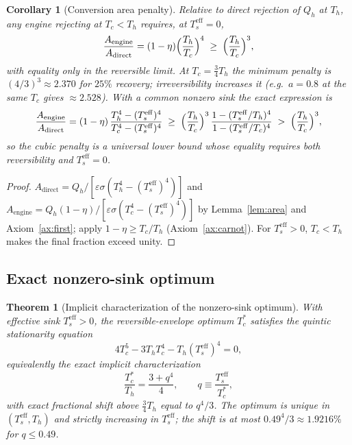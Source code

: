 \documentclass[11pt]{article}
\newtheorem{theorem}{Theorem}
\newtheorem{corollary}{Corollary}
\theoremstyle{definition}
\theoremstyle{remark}
\newcommand{\Th}{T_h}
\newcommand{\Tc}{T_c}
\newcommand{\Ts}{T_s^{\mathrm{eff}}}
\newcommand{\eps}{\varepsilon}
\begin{document}
\begin{corollary}[Conversion area penalty]\label{cor:penalty}
Relative to direct rejection of $Q_{h}$ at $\Th$, any engine rejecting at $\Tc<\Th$ requires, at $\Ts=0$,
\begin{equation}
\frac{A_{\mathrm{engine}}}{A_{\mathrm{direct}}}
=(1-\eta)\Bigl(\frac{\Th}{\Tc}\Bigr)^{4}
\;\ge\;\Bigl(\frac{\Th}{\Tc}\Bigr)^{3},
\end{equation}
with equality only in the reversible limit. At $\Tc=\tfrac{3}{4}\Th$ the minimum penalty is $(4/3)^{3}\approx2.370$ for $25\%$ recovery; irreversibility increases it (e.g.\ $a=0.8$ at the same $\Tc$ gives $\approx2.528$). With a common nonzero sink the exact expression is
\begin{equation}
\frac{A_{\mathrm{engine}}}{A_{\mathrm{direct}}}
=(1-\eta)\,\frac{\Th^{4}-(\Ts)^{4}}{\Tc^{4}-(\Ts)^{4}}
\;\ge\;\Bigl(\frac{\Th}{\Tc}\Bigr)^{3}\,
\frac{1-(\Ts/\Th)^{4}}{1-(\Ts/\Tc)^{4}}
\;>\;\Bigl(\frac{\Th}{\Tc}\Bigr)^{3},
\end{equation}
so the cubic penalty is a universal lower bound whose equality requires both reversibility and $\Ts=0$.
\end{corollary}

\begin{proof}
$A_{\mathrm{direct}}=Q_{h}/[\eps\sigma(\Th^{4}-(\Ts)^{4})]$ and $A_{\mathrm{engine}}=Q_{h}(1-\eta)/[\eps\sigma(\Tc^{4}-(\Ts)^{4})]$ by Lemma~\ref{lem:area} and Axiom~\ref{ax:first}; apply $1-\eta\ge\Tc/\Th$ (Axiom~\ref{ax:carnot}). For $\Ts>0$, $\Tc<\Th$ makes the final fraction exceed unity.
\end{proof}

\subsection{Exact nonzero-sink optimum}

\begin{theorem}[Implicit characterization of the nonzero-sink optimum]\label{thm:sink}
With effective sink $\Ts>0$, the reversible-envelope optimum $\Tc^{*}$ satisfies the quintic stationarity equation
\begin{equation}
4\Tc^{5}-3\Th \Tc^{4}-\Th(\Ts)^{4}=0,
\label{eq:quintic}
\end{equation}
equivalently the exact implicit characterization
\begin{equation}
\frac{\Tc^{*}}{\Th}=\frac{3+q^{4}}{4},
\qquad q\equiv\frac{\Ts}{\Tc^{*}},
\label{eq:fixedpoint}
\end{equation}
with exact fractional shift above $\tfrac{3}{4}\Th$ equal to $q^{4}/3$. The optimum is unique in $(\Ts,\Th)$ and strictly increasing in $\Ts$; the shift is at most $0.49^{4}/3\approx1.9216\%$ for $q\le0.49$.
\end{theorem}
\end{document}
